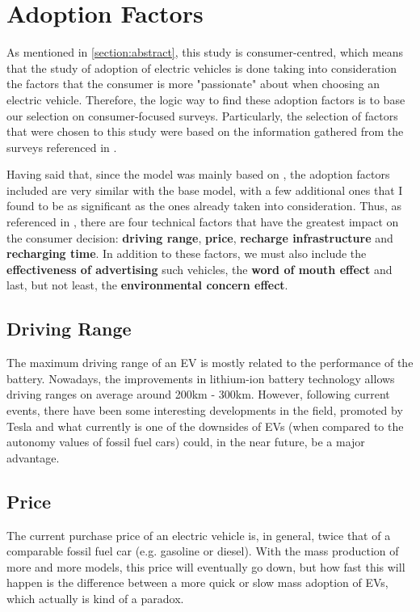 \section{Adoption Factors} \label{section:factors}
As mentioned in \ref{section:abstract}, this study is consumer-centred, which means that the study of adoption of electric vehicles is done taking into consideration the factors that the consumer is more "passionate" about when choosing an electric vehicle. Therefore, the logic way to find these adoption factors is to base our selection on consumer-focused surveys. Particularly, the selection of factors that were chosen to this study were based on the information gathered from the surveys referenced in \cite{thesis-base, yue-xiang-paper}.

Having said that, since the model was mainly based on \cite{thesis-base}, the adoption factors included are very similar with the base model, with a few additional ones that I found to be as significant as the ones already taken into consideration. Thus, as referenced in \cite{thesis-base}, there are four technical factors that have the greatest impact on the consumer decision: \textbf{driving range}, \textbf{price}, \textbf{recharge infrastructure} and \textbf{recharging time}. In addition to these factors, we must also include the \textbf{effectiveness of advertising} such vehicles, the \textbf{word of mouth effect} and last, but not least, the \textbf{environmental concern effect}.

\subsection{Driving Range}
The maximum driving range of an EV is mostly related to the performance of the battery. Nowadays, the improvements in lithium-ion battery technology allows driving ranges on average around 200km - 300km. However, following current events, there have been some interesting developments in the field, promoted by Tesla and what currently is one of the downsides of EVs (when compared to the autonomy values of fossil fuel cars) could, in the near future, be a major advantage.

\subsection{Price}
The current purchase price of an electric vehicle is, in general, twice that of a comparable fossil fuel car (e.g. gasoline or diesel). With the mass production of more and more models, this price will eventually go down, but how fast this will happen is the difference between a more quick or slow mass adoption of EVs, which actually is kind of a paradox.

